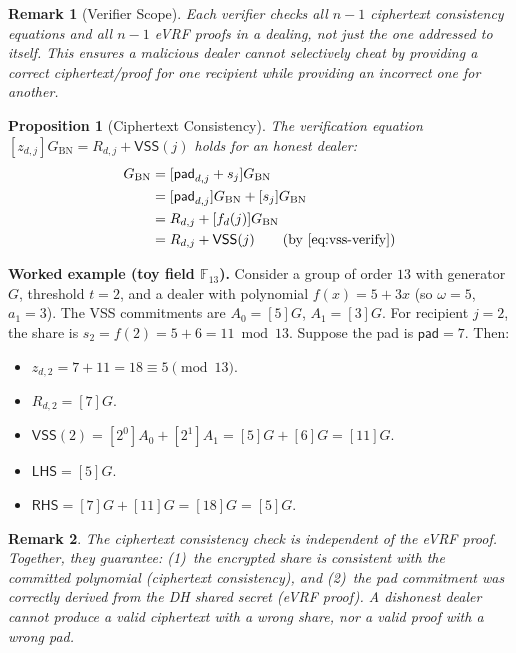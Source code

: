 \documentclass[11pt,a4paper]{article}
\newtheorem{proposition}[theorem]{Proposition}
\newtheorem{remark}{Remark}[section]
\newcommand{\F}{\mathbb{F}}
\newcommand{\genbn}{G_{\mathrm{BN}}}
\newcommand{\pad}{\mathsf{pad}}
\newcommand{\VSS}{\mathsf{VSS}}
\begin{document}
\begin{remark}[Verifier Scope]
  Each verifier checks \emph{all} $n - 1$ ciphertext consistency equations and
  \emph{all} $n - 1$ eVRF proofs in a dealing, not just the one addressed to
  itself. This ensures a malicious dealer cannot selectively cheat by providing
  a correct ciphertext/proof for one recipient while providing an incorrect one
  for another.
\end{remark}

\begin{proposition}[Ciphertext Consistency]
  \label{prop:ct-verify}
  The verification equation $[z_{d,j}]\genbn = R_{d,j} + \VSS(j)$ holds for an
  honest dealer:
  \begin{align}
    [z_{d,j}]\genbn
    &= [\pad_{d,j} + s_j]\genbn \\
    &= [\pad_{d,j}]\genbn + [s_j]\genbn \\
    &= R_{d,j} + [f_d(j)]\genbn \\
    &= R_{d,j} + \VSS(j) \qquad \text{(by~\eqref{eq:vss-verify})}
  \end{align}
\end{proposition}

\medskip
\noindent\textbf{Worked example (toy field $\F_{13}$).}
Consider a group of order $13$ with generator $G$, threshold $t = 2$, and
a dealer with polynomial $f(x) = 5 + 3x$ (so $\omega = 5$, $a_1 = 3$).
The VSS commitments are $A_0 = [5]G$, $A_1 = [3]G$.
For recipient $j = 2$, the share is $s_2 = f(2) = 5 + 6 = 11 \bmod 13$.
Suppose the pad is $\pad = 7$. Then:
\begin{itemize}[nosep]
  \item $z_{d,2} = 7 + 11 = 18 \equiv 5 \pmod{13}$.
  \item $R_{d,2} = [7]G$.
  \item $\VSS(2) = [2^0]A_0 + [2^1]A_1 = [5]G + [6]G = [11]G$.
  \item $\mathsf{LHS} = [5]G$.
  \item $\mathsf{RHS} = [7]G + [11]G = [18]G = [5]G$. \checkmark
\end{itemize}

\begin{remark}
  The ciphertext consistency check is \emph{independent} of the eVRF proof.
  Together, they guarantee: (1)~the encrypted share is consistent with the
  committed polynomial (ciphertext consistency), and (2)~the pad commitment was
  correctly derived from the DH shared secret (eVRF proof). A dishonest dealer
  cannot produce a valid ciphertext with a wrong share, nor a valid proof with
  a wrong pad.
\end{remark}
\end{document}
